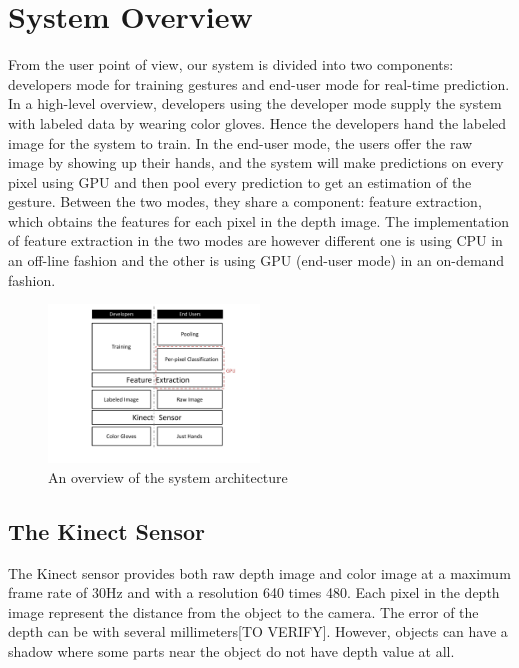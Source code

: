 \section{System Overview}
\label{sec: system}

From the user point of view, our system is divided into two components: developers mode for training gestures and end-user mode for real-time prediction. In a high-level overview, developers using the developer mode supply the system with labeled data by wearing color gloves. Hence the developers hand the labeled image for the system to train. In the end-user mode, the users offer the raw image by showing up their hands, and the system will make predictions on every pixel using GPU and then pool every prediction to get an estimation of the gesture. Between the two modes, they share a component: feature extraction, which obtains the features for each pixel in the depth image. The implementation of feature extraction in the two modes are however different one is using CPU in an off-line fashion and the other is using GPU (end-user mode) in an on-demand fashion. 




\begin{figure}
\centering
	\includegraphics[width=0.5\textwidth]{fig/SystemArchitecture.pdf}
	\caption{An overview of the system architecture}
\label{fig: architecture}
\end{figure}

\subsection{The Kinect Sensor}
The Kinect sensor provides both raw depth image and color image at a maximum frame rate of 30Hz and with a resolution 640 times 480. Each pixel in the depth image represent the distance from the object to the camera. The error of the depth can be with several millimeters[TO VERIFY]. However, objects can have a shadow where some parts near the object do not have depth value at all.   